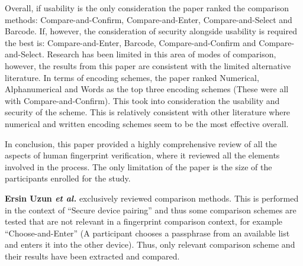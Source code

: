 Overall, if usability is the only consideration the paper ranked the comparison methods: Compare-and-Confirm, Compare-and-Enter, Compare-and-Select and Barcode. If, however, the consideration of security alongside usability is required the best is: Compare-and-Enter, Barcode, Compare-and-Confirm and Compare-and-Select. Research has been limited in this area of modes of comparison, however, the results from this paper are consistent with the limited alternative literature. In terms of encoding schemes, the paper ranked Numerical, Alphanumerical and Words as the top three encoding schemes (These were all with Compare-and-Confirm). This took into consideration the usability and security of the scheme. This is relatively consistent with other literature where numerical and written encoding schemes seem to be the most effective overall.

In conclusion, this paper provided a highly comprehensive review of all the aspects of human fingerprint verification, where it reviewed all the elements involved in the process. The only limitation of the paper is the size of the participants enrolled for the study.

\textbf{Ersin Uzun \textit{et al.}}\cite{uzun2007usability} exclusively reviewed comparison methods. This is performed in the context of ``Secure device pairing'' and thus some comparison schemes are tested that are not relevant in a fingerprint comparison context, for example  ``Choose-and-Enter'' (A participant chooses a passphrase from an available list and enters it into the other device). Thus, only relevant comparison scheme and their results have been extracted and compared. 

